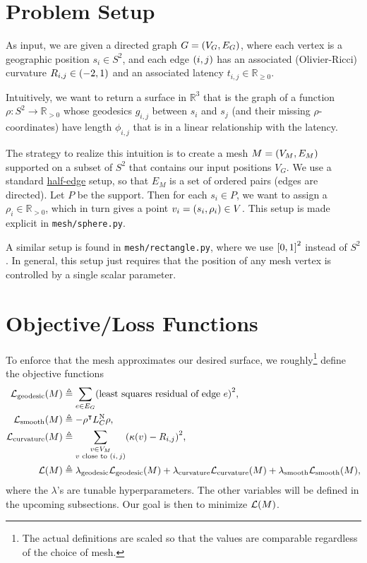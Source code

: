 \documentclass[10pt]{article}
\newcommand*\delimeter[3]{
	\ensuremath{\mathopen{}\left#2 #1\right#3\mathclose{}{\vphantom{\left#2 #1\right#3}}}
}
\newcommand*\pof[1]{\delimeter{#1}{(}{)}}
\newcommand*\ooint[1]{\delimeter{#1}{(}{)}}
\newcommand*\ccint[1]{\delimeter{#1}{[}{]}}
\begin{document}
	\pagestyle{empty}

	\section{Problem Setup}

	As input, we are given a directed graph \(G = \pof{V_G, E_G}\), where each vertex is a geographic position \(s_i \in S^2\), and each edge \(\pof{i, j}\) has an associated (Olivier-Ricci) curvature \(R_{i, j} \in \ooint{-2, 1}\) and an associated latency \(t_{i, j} \in \mathbb{R}_{\ge 0}\).

	Intuitively, we want to return a surface in \(\mathbb{R}^3\) that is the graph of a function \(\rho : S^2 \to \mathbb{R}_{> 0}\) whose geodesics \(g_{i, j}\) between \(s_i\) and \(s_j\) (and their missing \(\rho\)-coordinates) have length \(\phi_{i, j}\) that is in a linear relationship with the latency.

	The strategy to realize this intuition is to create a mesh \(M = \pof{V_M, E_M}\) supported on a subset of \(S^2\) that contains our input positions \(V_G\). We use a standard \href{https://en.wikipedia.org/wiki/Doubly_connected_edge_list}{half-edge} setup, so that \(E_M\) is a set of ordered pairs (edges are directed). Let \(P\) be the support. Then for each \(s_i \in P\), we want to assign a \(\rho_i \in \mathbb{R}_{> 0}\), which in turn gives a point \(v_i = \pof{s_i, \rho_i} \in V\). This setup is made explicit in \texttt{mesh/sphere.py}.

	A similar setup is found in \texttt{mesh/rectangle.py}, where we use \(\ccint{0, 1}^2\) instead of \(S^2\). In general, this setup just requires that the position of any mesh vertex is controlled by a single scalar parameter.

	\section{Objective/Loss Functions}

	To enforce that the mesh approximates our desired surface, we roughly\footnote{The actual definitions are scaled so that the values are comparable regardless of the choice of mesh.} define the objective functions \begin{align*}
		\mathcal{L}_{\mathrm{geodesic}}\pof{M} &\triangleq \sum_{e \in E_G} \pof{\text{least squares residual of edge \(e\)}}^2, \\
		\mathcal{L}_{\mathrm{smooth}}\pof{M} &\triangleq -\rho^\intercal L_C^{\text{N}}\rho, \\
		\mathcal{L}_{\mathrm{curvature}}\pof{M} &\triangleq \sum_{\substack{v \in V_M \\ \text{\(v\) close to \(\pof{i, j}\)}}} \pof{\kappa\pof{v} - R_{i, j}}^2, \\
		\mathcal{L}\pof{M} &\triangleq \lambda_{\mathrm{geodesic}}\mathcal{L}_{\mathrm{geodesic}}\pof{M} + \lambda_{\mathrm{curvature}}\mathcal{L}_{\mathrm{curvature}}\pof{M} + \lambda_{\mathrm{smooth}}\mathcal{L}_{\mathrm{smooth}}\pof{M},
	\end{align*} where the \(\lambda\)'s are tunable hyperparameters. The other variables will be defined in the upcoming subsections. Our goal is then to minimize \(\mathcal{L}\pof{M}\).
\end{document}
